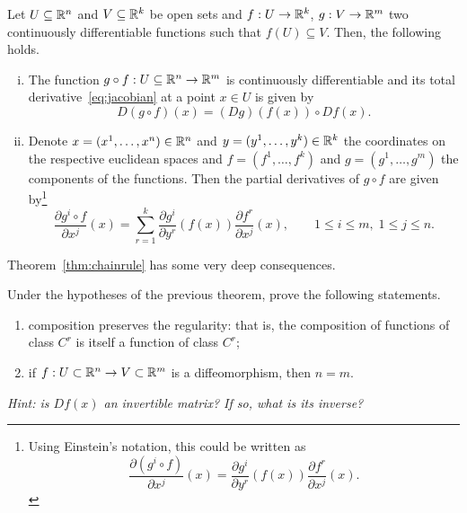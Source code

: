 \begin{theorem}\label{thm:chainrule}
	Let $U\subseteq\mathbb{R}^n$ and $V\subseteq\mathbb{R}^k$ be open sets and $f: U \to \mathbb{R}^k$, $g: V\to\mathbb{R}^m$ two continuously differentiable functions such that $f(U)\subseteq V$.
	Then, the following holds.
	\begin{enumerate}[(i)]
		\item\label{thm:chainrule1} The function $g\circ f: U\subseteq\mathbb{R}^n \to\mathbb{R}^m$ is continuously differentiable and its total derivative~\eqref{eq:jacobian} at a point $x\in U$ is given by
		      \begin{equation}
			      D(g\circ f)(x) = (Dg)(f(x)) \circ Df(x).
		      \end{equation}
		\item\label{thm:chainrule2} Denote $x=(x^1, \ldots, x^n)\in\mathbb{R}^n$ and $y=(y^1,\ldots,y^k)\in\mathbb{R}^k$ the coordinates on the respective euclidean spaces and $f=(f^1,\ldots,f^k)$ and $g=(g^1,\ldots,g^m)$ the components of the functions. Then the partial derivatives of $g\circ f$ are given by\footnote{Using Einstein's notation, this could be written as \begin{equation}\frac{\partial (g^i\circ f)}{\partial x^j}(x) = \frac{\partial g^i}{\partial y^r}(f(x)) \frac{\partial f^r}{\partial x^j}(x).\end{equation}}
		      \begin{equation}
			      \frac{\partial g^i\circ f}{\partial x^j}(x)
			      = \sum_{r=1}^k \frac{\partial g^i}{\partial y^r}(f(x)) \frac{\partial f^r}{\partial x^j}(x),
			      \qquad 1\leq i \leq m,\; 1\leq j\leq n.
		      \end{equation}
	\end{enumerate}
\end{theorem}

Theorem~\ref{thm:chainrule} has some very deep consequences.
\begin{exercise}
	Under the hypotheses of the previous theorem, prove the following statements.
	\begin{enumerate}
		\item composition preserves the regularity: that is, the composition of functions of class $C^r$ is itself a function of class $C^r$;
		\item if $f:U\subset\mathbb{R}^n\to V\subset\mathbb{R}^m$ is a diffeomorphism, then $n=m$.
	\end{enumerate}
	\textit{\small Hint: is $Df(x)$ an invertible matrix? If so, what is its inverse?} %
\end{exercise}

